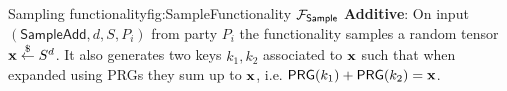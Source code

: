 \begin{Boxfig}{Sampling functionality}{fig:Sample}{Functionality
$\mathcal{F}_{\mathsf{Sample}}$}
\textbf{Additive}: On input $(\mathsf{SampleAdd}, d, S, P_i)$ from party
$P_i$ the functionality samples a random tensor $\mathbf{x} \stackrel{\small{\$}}{\leftarrow} S^d$. It also
generates two keys $k_1, k_2$ associated to $\mathbf{x}$ such that when expanded using PRGs
they sum up to $\mathbf{x}$, i.e. $\mathsf{PRG}(k_1) + \mathsf{PRG}(k_2) = \mathbf{x}$.
\end{Boxfig}
